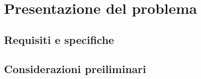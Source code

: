 \section{Presentazione del problema}
\label{sec:problema}

\subsection{Requisiti e specifiche}

\subsection{Considerazioni preiliminari}